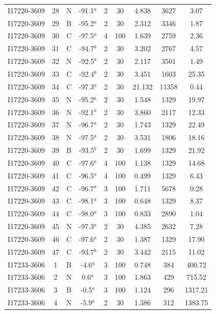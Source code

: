 \begin{table}
\begin{tabular}{ccccccccc}
I17220-3609 & 28 & N & -91.1$^{a}$ & 2 & 30 & 4.838 & 3627 & 3.07 \\
I17220-3609 & 29 & B & -95.2$^{a}$ & 2 & 30 & 2.312 & 3346 & 1.87 \\
I17220-3609 & 30 & C & -97.5$^{a}$ & 4 & 100 & 1.639 & 2759 & 2.36 \\
I17220-3609 & 31 & C & -94.7$^{b}$ & 2 & 30 & 3.202 & 2767 & 4.57 \\
I17220-3609 & 32 & N & -92.5$^{b}$ & 2 & 30 & 2.117 & 3501 & 1.49 \\
I17220-3609 & 33 & C & -92.4$^{b}$ & 2 & 30 & 3.451 & 1603 & 25.35 \\
I17220-3609 & 34 & C & -97.3$^{a}$ & 2 & 30 & 21.132 & 11358 & 0.44 \\
I17220-3609 & 35 & N & -95.2$^{a}$ & 2 & 30 & 1.548 & 1329 & 19.97 \\
I17220-3609 & 36 & N & -92.1$^{a}$ & 2 & 30 & 3.860 & 2117 & 12.33 \\
I17220-3609 & 37 & N & -96.7$^{a}$ & 2 & 30 & 1.743 & 1329 & 22.49 \\
I17220-3609 & 38 & N & -97.5$^{a}$ & 2 & 30 & 3.531 & 1806 & 18.16 \\
I17220-3609 & 39 & B & -93.5$^{b}$ & 2 & 30 & 1.699 & 1329 & 21.92 \\
I17220-3609 & 40 & C & -97.6$^{a}$ & 4 & 100 & 1.138 & 1329 & 14.68 \\
I17220-3609 & 41 & C & -96.5$^{a}$ & 4 & 100 & 0.499 & 1329 & 6.43 \\
I17220-3609 & 42 & C & -96.7$^{a}$ & 3 & 100 & 1.711 & 5678 & 0.28 \\
I17220-3609 & 43 & C & -98.1$^{a}$ & 3 & 100 & 0.648 & 1329 & 8.37 \\
I17220-3609 & 44 & C & -98.0$^{a}$ & 3 & 100 & 0.833 & 2890 & 1.04 \\
I17220-3609 & 45 & N & -97.3$^{a}$ & 2 & 30 & 4.385 & 2632 & 7.28 \\
I17220-3609 & 46 & C & -97.6$^{a}$ & 2 & 30 & 1.387 & 1329 & 17.90 \\
I17220-3609 & 47 & C & -93.7$^{b}$ & 2 & 30 & 3.442 & 2115 & 11.02 \\
I17233-3606 & 1 & B & -4.6$^{a}$ & 3 & 100 & 0.748 & 384 & 400.72 \\
I17233-3606 & 2 & N & 0.6$^{a}$ & 3 & 100 & 1.863 & 429 & 715.52 \\
I17233-3606 & 3 & B & -0.5$^{a}$ & 3 & 100 & 1.124 & 296 & 1317.21 \\
I17233-3606 & 4 & N & -5.9$^{a}$ & 2 & 30 & 1.386 & 312 & 1383.75 \\

\end{tabular}
\end{table}
